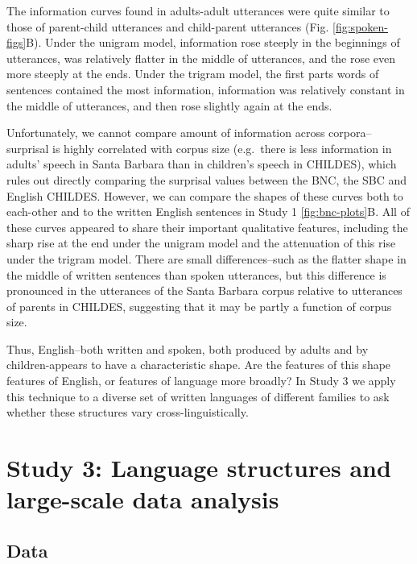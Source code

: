 \documentclass[
  english,
  man,floatsintext]{apa6}
\begin{document}
The information curves found in adults-adult utterances were quite similar to those of parent-child utterances and child-parent utterances (Fig. \ref{fig:spoken-figs}B). Under the unigram model, information rose steeply in the beginnings of utterances, was relatively flatter in the middle of utterances, and the rose even more steeply at the ends. Under the trigram model, the first parts words of sentences contained the most information, information was relatively constant in the middle of utterances, and then rose slightly again at the ends.

Unfortunately, we cannot compare amount of information across corpora--surprisal is highly correlated with corpus size (e.g.~there is less information in adults' speech in Santa Barbara than in children's speech in CHILDES), which rules out directly comparing the surprisal values between the BNC, the SBC and English CHILDES. However, we can compare the shapes of these curves both to each-other and to the written English sentences in Study 1 \ref{fig:bnc-plots}B. All of these curves appeared to share their important qualitative features, including the sharp rise at the end under the unigram model and the attenuation of this rise under the trigram model. There are small differences--such as the flatter shape in the middle of written sentences than spoken utterances, but this difference is pronounced in the utterances of the Santa Barbara corpus relative to utterances of parents in CHILDES, suggesting that it may be partly a function of corpus size.

Thus, English--both written and spoken, both produced by adults and by children-appears to have a characteristic shape. Are the features of this shape features of English, or features of language more broadly? In Study 3 we apply this technique to a diverse set of written languages of different families to ask whether these structures vary cross-linguistically.

\hypertarget{study-3-language-structures-and-large-scale-data-analysis}{%
\section{Study 3: Language structures and large-scale data analysis}\label{study-3-language-structures-and-large-scale-data-analysis}}

\hypertarget{data-2}{%
\subsection{Data}\label{data-2}}
\end{document}
